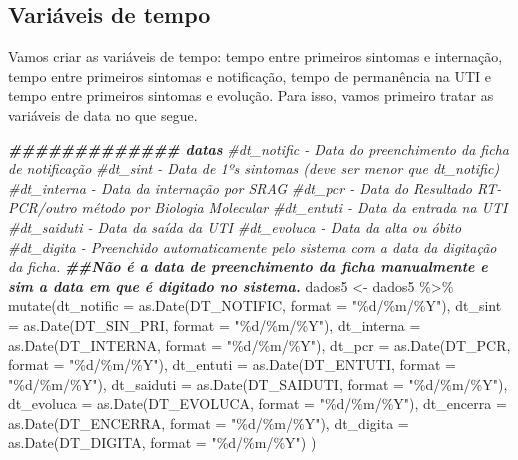 \documentclass[
]{article}
\newenvironment{Shaded}{\begin{snugshade}}{\end{snugshade}}
\newcommand{\AttributeTok}[1]{\textcolor[rgb]{0.77,0.63,0.00}{#1}}
\newcommand{\CommentTok}[1]{\textcolor[rgb]{0.56,0.35,0.01}{\textit{#1}}}
\newcommand{\DocumentationTok}[1]{\textcolor[rgb]{0.56,0.35,0.01}{\textbf{\textit{#1}}}}
\newcommand{\FunctionTok}[1]{\textcolor[rgb]{0.00,0.00,0.00}{#1}}
\newcommand{\NormalTok}[1]{#1}
\newcommand{\OtherTok}[1]{\textcolor[rgb]{0.56,0.35,0.01}{#1}}
\newcommand{\SpecialCharTok}[1]{\textcolor[rgb]{0.00,0.00,0.00}{#1}}
\newcommand{\StringTok}[1]{\textcolor[rgb]{0.31,0.60,0.02}{#1}}
\begin{document}
\hypertarget{variuxe1veis-de-tempo}{%
\subsection{Variáveis de tempo}\label{variuxe1veis-de-tempo}}

Vamos criar as variáveis de tempo: tempo entre primeiros sintomas e
internação, tempo entre primeiros sintomas e notificação, tempo de
permanência na UTI e tempo entre primeiros sintomas e evolução. Para
isso, vamos primeiro tratar as variáveis de data no que segue.

\begin{Shaded}
\begin{Highlighting}[]
\DocumentationTok{\#\#\#\#\#\#\#\#\#\#\#\#\# datas}
\CommentTok{\#dt\_notific {-} Data do preenchimento da ficha de notificação}
\CommentTok{\#dt\_sint {-} Data de 1ºs sintomas (deve ser menor que dt\_notific)}
\CommentTok{\#dt\_interna {-} Data da internação por SRAG}
\CommentTok{\#dt\_pcr {-} Data do Resultado RT{-}PCR/outro método por Biologia Molecular}
\CommentTok{\#dt\_entuti {-} Data da entrada na UTI}
\CommentTok{\#dt\_saiduti {-} Data da saída da UTI }
\CommentTok{\#dt\_evoluca {-} Data da alta ou óbito}
\CommentTok{\#dt\_digita {-} Preenchido automaticamente pelo sistema com a data da digitação da ficha. }
\DocumentationTok{\#\#Não é a data de preenchimento da ficha manualmente e sim a data em que é digitado no sistema.}
\NormalTok{dados5 }\OtherTok{\textless{}{-}}\NormalTok{  dados5 }\SpecialCharTok{\%\textgreater{}\%} 
  \FunctionTok{mutate}\NormalTok{(}\AttributeTok{dt\_notific =} \FunctionTok{as.Date}\NormalTok{(DT\_NOTIFIC, }\AttributeTok{format =} \StringTok{"\%d/\%m/\%Y"}\NormalTok{),}
         \AttributeTok{dt\_sint =} \FunctionTok{as.Date}\NormalTok{(DT\_SIN\_PRI, }\AttributeTok{format =} \StringTok{"\%d/\%m/\%Y"}\NormalTok{),}
         \AttributeTok{dt\_interna =} \FunctionTok{as.Date}\NormalTok{(DT\_INTERNA, }\AttributeTok{format =} \StringTok{"\%d/\%m/\%Y"}\NormalTok{),}
         \AttributeTok{dt\_pcr =} \FunctionTok{as.Date}\NormalTok{(DT\_PCR, }\AttributeTok{format =} \StringTok{"\%d/\%m/\%Y"}\NormalTok{),}
         \AttributeTok{dt\_entuti  =} \FunctionTok{as.Date}\NormalTok{(DT\_ENTUTI,  }\AttributeTok{format =} \StringTok{"\%d/\%m/\%Y"}\NormalTok{),}
         \AttributeTok{dt\_saiduti =} \FunctionTok{as.Date}\NormalTok{(DT\_SAIDUTI, }\AttributeTok{format =} \StringTok{"\%d/\%m/\%Y"}\NormalTok{),}
         \AttributeTok{dt\_evoluca =} \FunctionTok{as.Date}\NormalTok{(DT\_EVOLUCA, }\AttributeTok{format =} \StringTok{"\%d/\%m/\%Y"}\NormalTok{),}
         \AttributeTok{dt\_encerra =} \FunctionTok{as.Date}\NormalTok{(DT\_ENCERRA, }\AttributeTok{format =} \StringTok{"\%d/\%m/\%Y"}\NormalTok{),}
         \AttributeTok{dt\_digita =} \FunctionTok{as.Date}\NormalTok{(DT\_DIGITA, }\AttributeTok{format =} \StringTok{"\%d/\%m/\%Y"}\NormalTok{)}
\NormalTok{  )}


\end{Highlighting}
\end{Shaded}
\end{document}
